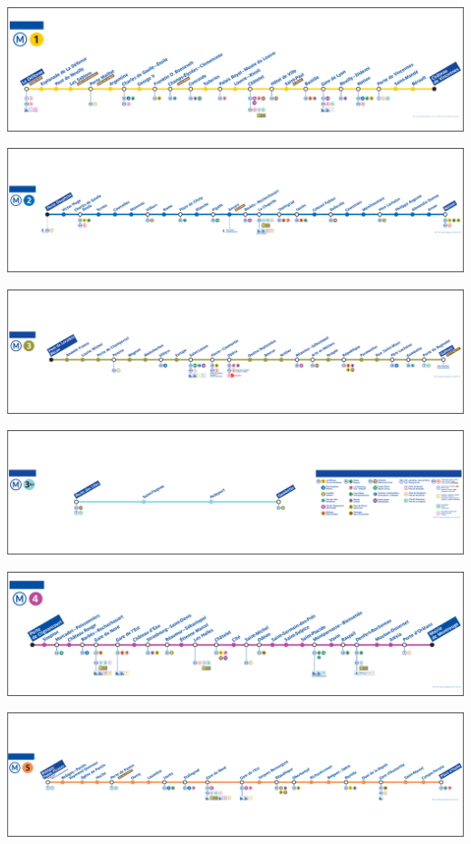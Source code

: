 \documentclass[,french]{article}
\begin{document}
\newpage
\begin{landscape}

\includegraphics{img/plan_lignes/plan-de-ligne_metro_ligne-1.pdf}

\includegraphics{img/plan_lignes/plan-de-ligne_metro_ligne-2.pdf}

\includegraphics{img/plan_lignes/plan-de-ligne_metro_ligne-3.pdf}

\includegraphics{img/plan_lignes/plan-de-ligne_metro_ligne-3b.pdf}

\includegraphics{img/plan_lignes/plan-de-ligne_metro_ligne-4.pdf}

\includegraphics{img/plan_lignes/plan-de-ligne_metro_ligne-5.pdf}


\end{landscape}
\end{document}
